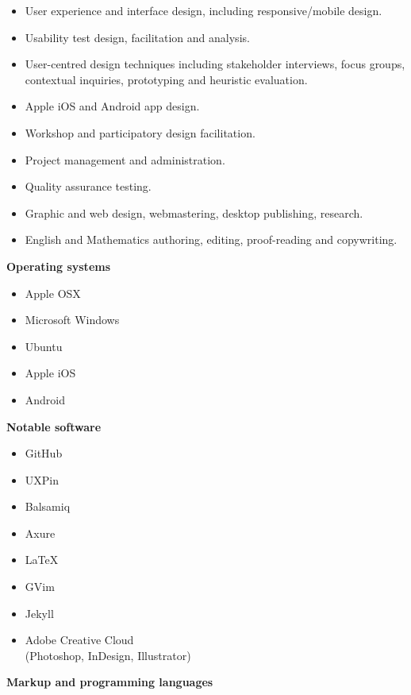 \documentclass[]{friggeri-cv} %
\begin{document}
\begin{itemize}
\item User experience and interface design, including responsive/mobile design.
\item Usability test design, facilitation and analysis.
\item User-centred design techniques including stakeholder interviews, focus groups, contextual inquiries, prototyping and heuristic evaluation.
\item Apple iOS and Android app design. 
\item Workshop and participatory design facilitation.
\item Project management and administration.
\item Quality assurance testing.
\item Graphic and web design, webmastering, desktop publishing, research.
\item English and Mathematics authoring, editing, proof-reading and copywriting.

\end{itemize}


\textbf{Operating systems}
\begin{multicols}{2}
\begin{itemize}
 \item Apple OSX
 \item Microsoft Windows
 \item Ubuntu
 \item Apple iOS
 \item Android
\end{itemize}
\end{multicols}

\textbf{Notable software}
\begin{multicols}{2}
\begin{itemize}
 \item GitHub
 \item UXPin
\item Balsamiq
 \item Axure
 \item LaTeX
 \item GVim
 \item Jekyll
   \item Adobe Creative Cloud \\ (Photoshop, InDesign, Illustrator)
\end{itemize}
\end{multicols}

\textbf{Markup and programming languages}\\
\end{document}
